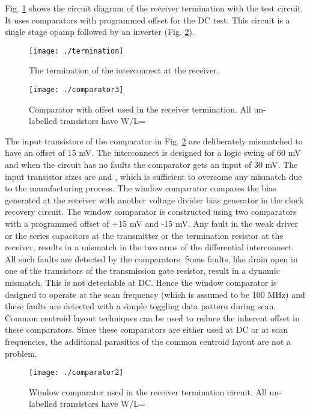 \documentclass[conference]{IEEEtran}
\begin{document}
Fig. \ref{fig:term-adc} shows the circuit
diagram of the receiver termination with the test circuit.
It uses comparators with programmed offset for the DC test. 
This circuit is a single 
stage opamp followed by an inverter (Fig. \ref{fig:dc-comp}). 

\begin{figure}[h!]
\centering
{}
\texttt{[image: ./termination]}
\caption{The termination of the interconnect at the receiver.}
\label{fig:term-adc}
\end{figure}
\begin{figure}[h]
\centering
\psfrag{+}{\small{}}
\psfrag{-}{\small{}}
\texttt{[image: ./comparator3]}
\caption{Comparator with offset used in the receiver termination. All
un-labelled transistors have W/L=}
\label{fig:dc-comp}
\end{figure}
The input transistors of the comparator in Fig. \ref{fig:dc-comp} are 
deliberately mismatched to have an offset of 15 mV.
The interconnect is designed for a logic swing of 60 mV and
when the circuit has no faults the comparator gets an input of 30 mV. 
The input transistor sizes are  and ,
which is sufficient to overcome any mismatch due to the manufacturing process.
The window comparator compares the bias generated
at the receiver with another voltage divider bias generator in the clock recovery
circuit. The window comparator is constructed using two comparators with a
programmed offset of +15 mV and -15 mV. 
Any fault in the weak driver or the series capacitors at the transmitter
or the termination resistor at the receiver,
results in a mismatch in the two arms of the differential interconnect. 
All such faults are detected by the comparators. Some faults, like drain open
in one of the transistors of the transmission gate resistor, result in a 
dynamic mismatch. This is not detectable at DC. Hence the window comparator
is designed to operate at the scan frequency (which is assumed to be 100 MHz) 
and these faults are detected with a simple toggling data pattern during scan.
Common centroid layout techniques can be used to reduce the inherent 
offset in these comparators. Since these comparators are either used at 
DC or at scan frequencies, the additional parasitics of the common centroid
layout are not a problem.
\begin{figure}[h!]
\centering
{}
\texttt{[image: ./comparator2]}
\caption{Window comparator used in the receiver termination circuit. All
un-labelled transistors have W/L=}
\label{fig:window-comp-100}
\end{figure}
\end{document}

